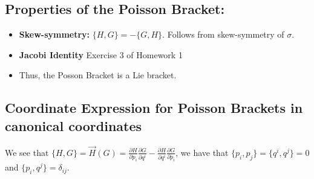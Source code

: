 \documentclass{article}
\newcommand{\pdof}[2]{\frac{\partial #1}{\partial #2}}
\begin{document}
\subsection{Properties of the Poisson Bracket:}
\begin{itemize}
    \item \textbf{Skew-symmetry:} $\{H,G\} = -\{G,H\}$. Follows from skew-symmetry of $\sigma$.
    \item \textbf{Jacobi Identity} Exercise 3 of Homework 1
    \item Thus, the Posson Bracket is a Lie bracket.
\end{itemize}
\subsection{Coordinate Expression for Poisson Brackets in canonical coordinates}
We see that $\{H,G\} = \vec H(G) = \pdof{H}{p_i}\pdof{G}{q^i} - \pdof{H}{q^i}\pdof{G}{p_i}$, we have that $\{p_i,p_j\} = \{q^i,q^j\} = 0$ and $\{p_i,q^j\} = \delta_{ij}$.
\end{document}
